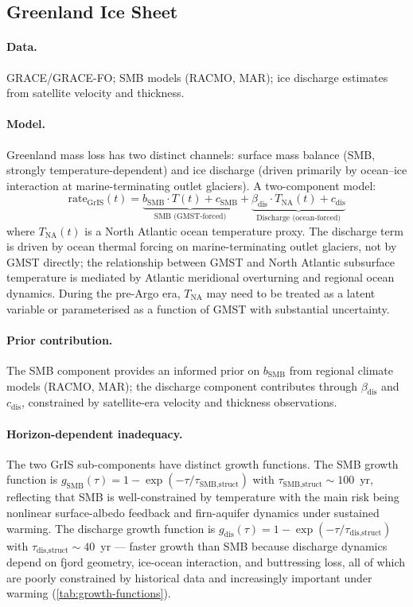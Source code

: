 \documentclass[11pt]{article}
\begin{document}
\subsection{Greenland Ice Sheet}
\label{sec:gris}

\paragraph{Data.}  GRACE/GRACE-FO; SMB models (RACMO, MAR); ice discharge estimates from satellite velocity and thickness.

\paragraph{Model.}  Greenland mass loss has two distinct channels: surface mass balance (SMB, strongly temperature-dependent) and ice discharge (driven primarily by ocean--ice interaction at marine-terminating outlet glaciers).  A two-component model:
\begin{equation}
  \text{rate}_{\text{GrIS}}(t) = \underbrace{b_{\text{SMB}} \cdot T(t) + c_{\text{SMB}}}_{\text{SMB (GMST-forced)}} + \underbrace{\beta_{\text{dis}} \cdot T_{\text{NA}}(t) + c_{\text{dis}}}_{\text{Discharge (ocean-forced)}}
\end{equation}
where $T_{\text{NA}}(t)$ is a North Atlantic ocean temperature proxy.  The discharge term is driven by ocean thermal forcing on marine-terminating outlet glaciers, not by GMST directly; the relationship between GMST and North Atlantic subsurface temperature is mediated by Atlantic meridional overturning and regional ocean dynamics.  During the pre-Argo era, $T_{\text{NA}}$ may need to be treated as a latent variable or parameterised as a function of GMST with substantial uncertainty.

\paragraph{Prior contribution.}  The SMB component provides an informed prior on $b_{\text{SMB}}$ from regional climate models (RACMO, MAR); the discharge component contributes through $\beta_{\text{dis}}$ and $c_{\text{dis}}$, constrained by satellite-era velocity and thickness observations.

\paragraph{Horizon-dependent inadequacy.}  The two GrIS sub-components have distinct growth functions.  The SMB growth function is $g_{\text{SMB}}(\tau) = 1 - \exp(-\tau / \tau_{\text{SMB,struct}})$ with $\tau_{\text{SMB,struct}} \sim 100$~yr, reflecting that SMB is well-constrained by temperature with the main risk being nonlinear surface-albedo feedback and firn-aquifer dynamics under sustained warming.  The discharge growth function is $g_{\text{dis}}(\tau) = 1 - \exp(-\tau / \tau_{\text{dis,struct}})$ with $\tau_{\text{dis,struct}} \sim 40$~yr --- faster growth than SMB because discharge dynamics depend on fjord geometry, ice-ocean interaction, and buttressing loss, all of which are poorly constrained by historical data and increasingly important under warming (\cref{tab:growth-functions}).
\end{document}
